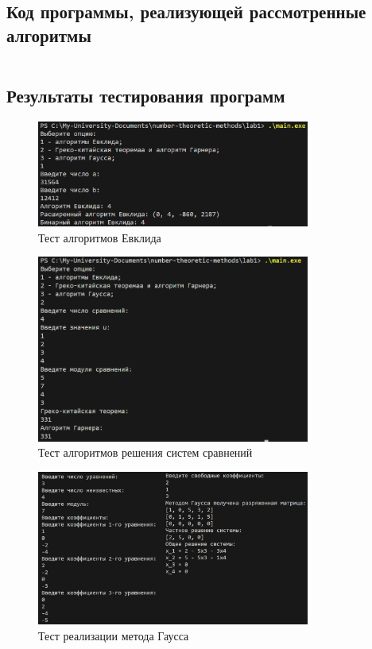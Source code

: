 \documentclass[bachelor, och, labwork]{shiza}
\begin{document}
    \subsection{Код программы, реализующей рассмотренные алгоритмы}

        \inputminted[breaklines,fontsize=\small,linenos]{rust}{../main.rs}

    \subsection{Результаты тестирования программ}
        \begin{figure}[H]
            \centering
            \includegraphics[width=0.8\textwidth]{pic/1.png}
            \caption{Тест алгоритмов Евклида}
        \end{figure}

        \begin{figure}[H]
            \centering
            \includegraphics[width=0.8\textwidth]{pic/2.png}
            \caption{Тест алгоритмов решения систем сравнений}
        \end{figure}

        \begin{figure}[H]
            \centering
            \includegraphics[width=0.8\textwidth]{pic/3.png}
            \caption{Тест реализации метода Гаусса}
        \end{figure}
\end{document}
